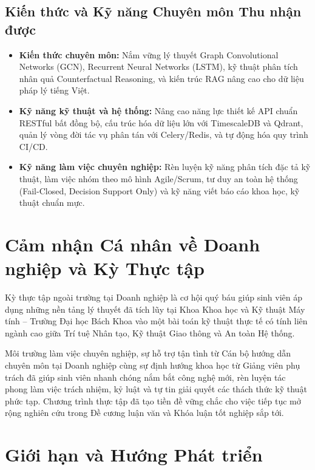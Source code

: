 \subsection{Kiến thức và Kỹ năng Chuyên môn Thu nhận được}
\begin{itemize}[leftmargin=1.5cm, label=$\bullet$]
  \item \textbf{Kiến thức chuyên môn:} Nắm vững lý thuyết Graph Convolutional Networks (GCN), Recurrent Neural Networks (LSTM), kỹ thuật phân tích nhân quả Counterfactual Reasoning, và kiến trúc RAG nâng cao cho dữ liệu pháp lý tiếng Việt.
  \item \textbf{Kỹ năng kỹ thuật và hệ thống:} Nâng cao năng lực thiết kế API chuẩn RESTful bất đồng bộ, cấu trúc hóa dữ liệu lớn với TimescaleDB và Qdrant, quản lý vòng đời tác vụ phân tán với Celery/Redis, và tự động hóa quy trình CI/CD.
  \item \textbf{Kỹ năng làm việc chuyên nghiệp:} Rèn luyện kỹ năng phân tích đặc tả kỹ thuật, làm việc nhóm theo mô hình Agile/Scrum, tư duy an toàn hệ thống (Fail-Closed, Decision Support Only) và kỹ năng viết báo cáo khoa học, kỹ thuật chuẩn mực.
\end{itemize}

\section{Cảm nhận Cá nhân về Doanh nghiệp và Kỳ Thực tập}

Kỳ thực tập ngoài trường tại Doanh nghiệp là cơ hội quý báu giúp sinh viên áp dụng những nền tảng lý thuyết đã tích lũy tại Khoa Khoa học và Kỹ thuật Máy tính -- Trường Đại học Bách Khoa vào một bài toán kỹ thuật thực tế có tính liên ngành cao giữa Trí tuệ Nhân tạo, Kỹ thuật Giao thông và An toàn Hệ thống.

Môi trường làm việc chuyên nghiệp, sự hỗ trợ tận tình từ Cán bộ hướng dẫn chuyên môn tại Doanh nghiệp cùng sự định hướng khoa học từ Giảng viên phụ trách đã giúp sinh viên nhanh chóng nắm bắt công nghệ mới, rèn luyện tác phong làm việc trách nhiệm, kỷ luật và tự tin giải quyết các thách thức kỹ thuật phức tạp. Chương trình thực tập đã tạo tiền đề vững chắc cho việc tiếp tục mở rộng nghiên cứu trong Đề cương luận văn và Khóa luận tốt nghiệp sắp tới.

\section{Giới hạn và Hướng Phát triển}

